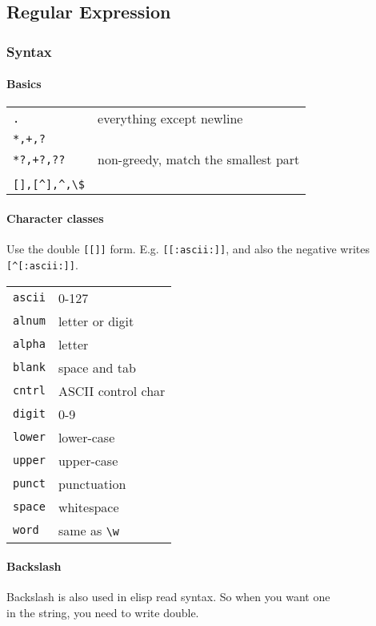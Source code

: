 \subsection{Regular Expression}
\subsubsection{Syntax}
\paragraph{Basics}
\begin{tabular}{@{}ll@{}}
  \texttt{.} & everything except newline\\
  \texttt{*,+,?} & \\
  \texttt{*?,+?,??} & non-greedy, match the smallest part\\
  \texttt{} &\\
  \texttt{\lstinline![],[^],^,\$!} &
\end{tabular}


\paragraph{Character classes}
Use the double \texttt{[[]]} form. E.g. \texttt{[[:ascii:]]}, and also the negative writes \lstinline![^[:ascii:]]!.

\begin{tabular}{@{}ll@{}}
  \texttt{ascii} & 0-127\\
  \texttt{alnum} & letter or digit\\
  \texttt{alpha} & letter\\
  \texttt{blank} & space and tab\\
  \texttt{cntrl} & ASCII control char\\
  \texttt{digit} & 0-9\\
  \texttt{lower} & lower-case\\
  \texttt{upper} & upper-case\\
  \texttt{punct} & punctuation\\
  \texttt{space} & whitespace\\
  \texttt{word} & same as \lstinline!\w!
\end{tabular}

\paragraph{Backslash}
Backslash is also used in elisp read syntax. So when you want one \texttt{\\} in the string, you need to write double.

